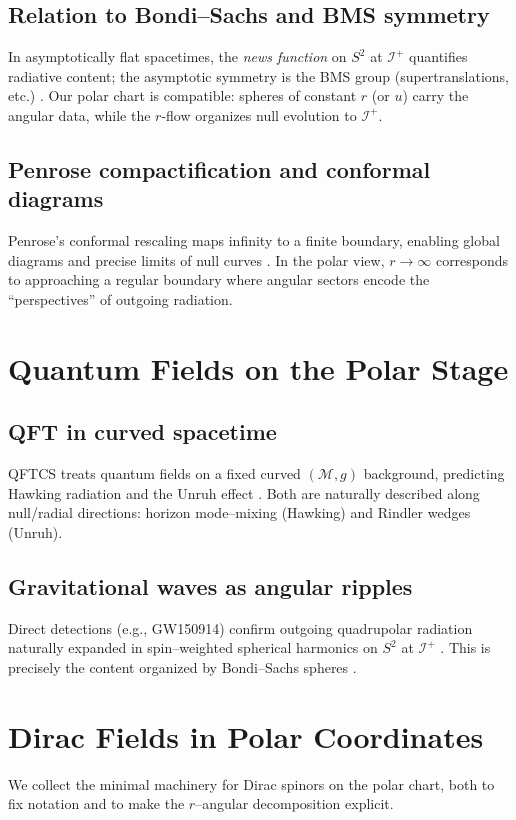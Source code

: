 \documentclass[12pt]{article}
\newcommand{\M}{\mathcal{M}}
\newcommand{\g}{g}
\newcommand{\Iplus}{\mathcal{I}^+}
\begin{document}
\subsection{Relation to Bondi--Sachs and BMS symmetry}
In asymptotically flat spacetimes, the \emph{news function} on $S^2$ at $\Iplus$ quantifies radiative content; the asymptotic symmetry is the BMS group (supertranslations, etc.) \citep{Bondi1962,Sachs1962,BMS}. Our polar chart is compatible: spheres of constant $r$ (or $u$) carry the angular data, while the $r$-flow organizes null evolution to $\Iplus$.

\subsection{Penrose compactification and conformal diagrams}
Penrose's conformal rescaling maps infinity to a finite boundary, enabling global diagrams and precise limits of null curves \citep{Penrose1964,NullInfinity}. In the polar view, $r\!\to\!\infty$ corresponds to approaching a regular boundary where angular sectors encode the ``perspectives'' of outgoing radiation.

\section{Quantum Fields on the Polar Stage}
\subsection{QFT in curved spacetime}
QFTCS treats quantum fields on a fixed curved $(\M,\g)$ background, predicting Hawking radiation and the Unruh effect \citep{BirrellDavies1982,ParkerToms2009,Hawking1975,Unruh1976}. Both are naturally described along null/radial directions: horizon mode–mixing (Hawking) and Rindler wedges (Unruh).

\subsection{Gravitational waves as angular ripples}
Direct detections (e.g., GW150914) confirm outgoing quadrupolar radiation naturally expanded in spin–weighted spherical harmonics on $S^2$ at $\Iplus$ \citep{Abbott2016GW}. This is precisely the content organized by Bondi--Sachs spheres \citep{Bondi1962,Sachs1962}.

\section{Dirac Fields in Polar Coordinates}\label{sec:dirac}
We collect the minimal machinery for Dirac spinors on the polar chart, both to fix notation and to make the $r$--angular decomposition explicit.
\end{document}
